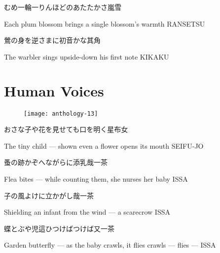 \begin{haiku}
    {\FH むめ一輪一りんほどのあたたかさ}\hfill{\FH 嵐雪}

    \vin{} Each plum blossom
    \vin{} \vin{} brings a single blossom's
    \vin{} \vin{} \vin{} warmth \hspace{\fill} RANSETSU
\end{haiku}

\begin{haiku}
    {\FH 鶯の身を逆さまに初音かな}\hfill{\FH 其角}

    \vin{} The warbler
    \vin{} \vin{} sings upside-down
    \vin{} \vin{} \vin{} his first note \hspace{\fill} KIKAKU
\end{haiku}

\chapter{Human Voices}

\begin{figure}
    \texttt{[image: anthology-13]}
\end{figure}

\begin{haiku}
    {\FH おさな子や花を見せても口を明く}\hfill{\FH 星布女}

    \vin{} The tiny child ---
    \vin{} \vin{} shown even a flower
    \vin{} \vin{} \vin{} opens its mouth \hspace{\fill} SEIFU-JO
\end{haiku}

\begin{haiku}
    {\FH 蚤の跡かぞへながらに添乳哉}\hfill{\FH 一茶}

    \vin{} Flea bites ---
    \vin{} \vin{} while counting them, she nurses
    \vin{} \vin{} \vin{} her baby \hspace{\fill} ISSA
\end{haiku}

\begin{haiku}
    {\FH {}子の風よけに立かがし哉}\hfill{\FH 一茶}

    \vin{} Shielding an infant
    \vin{} \vin{} from the wind ---
    \vin{} \vin{} \vin{} a scarecrow \hspace{\fill} ISSA
\end{haiku}

\begin{haiku}
    {\FH 蝶とぶや児這ひつけばつけば又}\hfill{\FH 一茶}

    \vin{} Garden butterfly ---
    \vin{} \vin{} as the baby crawls, it flies
    \vin{} \vin{} \vin{} crawls --- flies --- \hspace{\fill} ISSA
\end{haiku}

